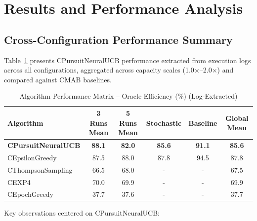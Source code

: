 \documentclass[12pt,a4paper]{article}
\newcommand{\primarytext}[1]{\textcolor{primaryblue}{\textbf{#1}}}
\begin{document}
\section{Results and Performance Analysis}

\begin{tcolorbox}[colback=tableheader,colframe=primaryblue,title=\textbf{Primary Performance Results (Log-Extracted)}]

\subsection{Cross-Configuration Performance Summary}

Table~\ref{tab:cpursuit_performance_matrix} presents CPursuitNeuralUCB performance extracted from execution logs across all configurations, aggregated across capacity scales (1.0$\times$–2.0$\times$) and compared against CMAB baselines.

\begin{table}[H]
\centering
\caption{Algorithm Performance Matrix -- Oracle Efficiency (\%) (Log-Extracted)}
\label{tab:cpursuit_performance_matrix}
\begin{tabular}{@{}lccccc@{}}
\toprule
\textbf{Algorithm} & \textbf{3 Runs Mean} & \textbf{5 Runs Mean} & \textbf{Stochastic} & \textbf{Baseline} & \textbf{Global Mean} \\
\midrule
\primarytext{CPursuitNeuralUCB} & \primarytext{88.1} & \primarytext{82.0} & \primarytext{85.6} & \primarytext{91.1} & \primarytext{85.6} \\
CEpsilonGreedy                  & 87.5               & 88.0               & 87.8               & 94.5               & 87.8 \\
CThompsonSampling               & 66.5               & 68.0               & -                  & -                  & 67.5 \\
CEXP4                           & 70.0               & 69.9               & -                  & -                  & 69.9 \\
CEpochGreedy                    & 37.7               & 37.6               & -                  & -                  & 37.7 \\
\bottomrule
\end{tabular}
\end{table}

Key observations centered on CPursuitNeuralUCB:


\end{tcolorbox}
\end{document}
